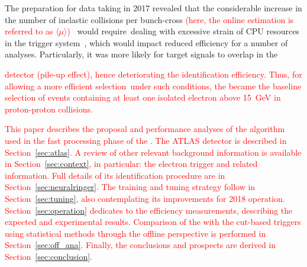 The preparation for data taking in 2017 revealed that the considerable increase in the number of inelastic collisions per bunch-cross \textcolor{red}{(here, the online estimation is referred to as $\langle \mu \rangle$)}~\cite{DAPR-2013-01} would require dealing with excessive strain of CPU resources in the trigger system~\cite{ATL-DAQ-PUB-2018-002}, which would impact reduced efficiency for a number of analyses. Particularly, it was more likely for target  signals to overlap in the \textcolor{red}{detector (pile-up effect), hence deteriorating the identification efficiency. Thus, for allowing a more efficient selection under such conditions, the \rnn{} became the baseline selection of events containing at least one isolated electron above \SI{15}{\GeV} in proton-proton collisions.




This paper describes the proposal and performance analyses of the \rnn{}
algorithm \textcolor{red}{used} in the fast processing phase of the \hlt{}. 
The ATLAS detector is described in Section~\ref{sec:atlas}. A review
of other relevant background information is available in
Section~\ref{sec:context}, in particular: the electron
trigger and related information. Full details of its identification procedure are
in Section~\ref{sec:neuralringer}. The training and tuning strategy follow in
Section~\ref{sec:tuning}, also contemplating its improvements for 2018
operation. Section~\ref{sec:operation} dedicates to the efficiency measurements,
describing the expected and experimental results. Comparison of the \rnn with
the cut-based triggers using statistical methods through the offline perspective
is performed in Section~\ref{sec:off_ana}. Finally, the conclusions and prospects 
are derived in Section~\ref{sec:conclusion}.


}
